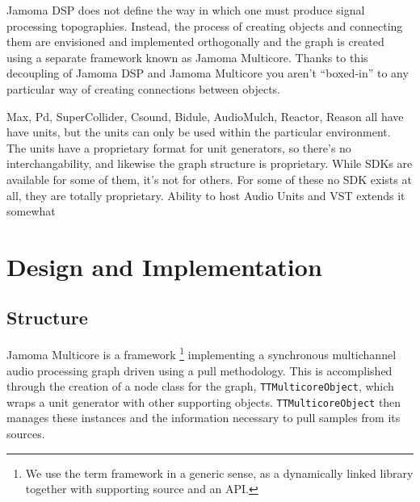 \documentclass[twoside,a4paper]{article}
\begin{document}
Jamoma DSP does not define the way in which one must produce signal processing topographies.  Instead, the process of creating objects and connecting them are envisioned and implemented orthogonally and the graph is created using a separate framework known as Jamoma Multicore.  Thanks to this decoupling of Jamoma DSP and Jamoma Multicore you aren't ``boxed-in'' to any particular way of creating connections between objects.

Max, Pd, SuperCollider, Csound, Bidule, AudioMulch, Reactor, Reason all have have units, but the units can only be used within the particular environment. The units have a proprietary format for unit generators, so there's no interchangability, and likewise the graph structure is proprietary. While SDKs are available for some of them, it's not for others. For some of these no SDK exists at all, they are totally proprietary. Ability to host Audio Units and VST extends it somewhat






\section{Design and Implementation} %

\subsection{Structure} %

Jamoma Multicore is a framework \footnote{We use the term framework in a generic sense, as a dynamically linked library together with supporting source and an API.} implementing a synchronous multichannel audio processing graph driven using a pull methodology.  This is accomplished through the creation of a node class for the graph, \texttt{TTMulticoreObject}, which wraps a unit generator with other supporting objects.  \texttt{TTMulticoreObject} then manages these instances and the information necessary to pull samples from its sources.
\end{document}
